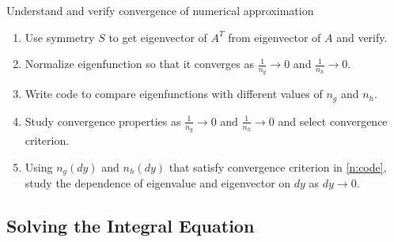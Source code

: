 \documentclass[]{article}
\begin{document}
Understand and verify convergence of numerical approximation
\begin{enumerate}
\item Use symmetry $S$ to get eigenvector of $A^T$ from eigenvector of
  $A$ and verify.
\item Normalize eigenfunction so that it converges as $\frac{1}{n_g}
  \rightarrow 0$ and $\frac{1}{n_h} \rightarrow 0$.
\item \label{n:code} Write code to compare eigenfunctions with
  different values of $n_g$ and $n_h$.
\item Study convergence properties as $\frac{1}{n_g} \rightarrow 0$
  and $\frac{1}{n_h} \rightarrow 0$ and select convergence criterion.
\item Using $n_g(dy)$ and $n_h(dy)$ that satisfy convergence criterion
  in \ref{n:code}, study the dependence of eigenvalue and eigenvector
  on $dy$ as $dy \rightarrow 0$.
\end{enumerate}

\subsection{Solving the Integral Equation}
\label{sec:solve}
\end{document}
